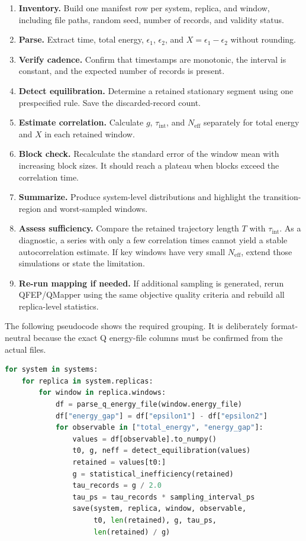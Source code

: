 \documentclass[11pt,a4paper]{article}
\begin{document}
\begin{enumerate}
  \item \textbf{Inventory.} Build one manifest row per system, replica, and window, including file paths, random seed, number of records, and validity status.
  \item \textbf{Parse.} Extract time, total energy, $\epsilon_1$, $\epsilon_2$, and $X=\epsilon_1-\epsilon_2$ without rounding.
  \item \textbf{Verify cadence.} Confirm that timestamps are monotonic, the interval is constant, and the expected number of records is present.
  \item \textbf{Detect equilibration.} Determine a retained stationary segment using one prespecified rule. Save the discarded-record count.
  \item \textbf{Estimate correlation.} Calculate $g$, $\tau_{\mathrm{int}}$, and $N_{\mathrm{eff}}$ separately for total energy and $X$ in each retained window.
  \item \textbf{Block check.} Recalculate the standard error of the window mean with increasing block sizes. It should reach a plateau when blocks exceed the correlation time.
  \item \textbf{Summarize.} Produce system-level distributions and highlight the transition-region and worst-sampled windows.
  \item \textbf{Assess sufficiency.} Compare the retained trajectory length $T$ with $\tau_{\mathrm{int}}$. As a diagnostic, a series with only a few correlation times cannot yield a stable autocorrelation estimate. If key windows have very small $N_{\mathrm{eff}}$, extend those simulations or state the limitation.
  \item \textbf{Re-run mapping if needed.} If additional sampling is generated, rerun QFEP/QMapper using the same objective quality criteria and rebuild all replica-level statistics.
\end{enumerate}

The following pseudocode shows the required grouping. It is deliberately format-neutral because the exact Q energy-file columns must be confirmed from the actual files.

\begin{lstlisting}[language=Python]
for system in systems:
    for replica in system.replicas:
        for window in replica.windows:
            df = parse_q_energy_file(window.energy_file)
            df["energy_gap"] = df["epsilon1"] - df["epsilon2"]
            for observable in ["total_energy", "energy_gap"]:
                values = df[observable].to_numpy()
                t0, g, neff = detect_equilibration(values)
                retained = values[t0:]
                g = statistical_inefficiency(retained)
                tau_records = g / 2.0
                tau_ps = tau_records * sampling_interval_ps
                save(system, replica, window, observable,
                     t0, len(retained), g, tau_ps,
                     len(retained) / g)
\end{lstlisting}
\end{document}
